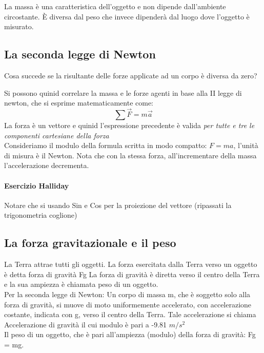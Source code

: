 \documentclass[12pt, a4paper, openany]{book}
\begin{document}
La massa è una caratteristica dell'oggetto e non dipende dall'ambiente circostante.
È diversa dal peso che invece dipenderà dal luogo dove l'oggetto è misurato.

\subsection*{La seconda legge di Newton}
Cosa succede se la risultante delle forze applicate ad un corpo è diversa da zero?

Si possono quinid correlare la massa e le forze agenti in base alla II legge di newton, che si esprime matematicamente come:
\[\sum \overrightarrow{F} = m\overrightarrow{a}\]
La forza è un vettore e quinid l'espressione precedente è valida \emph{per tutte e tre le componenti cartesiane della forza}
\\Consideriamo il modulo della formula scritta in modo compatto: $F=ma$, l'unità di misura è il Newton.
Nota che con la stessa forza, all'incrementare della massa l'accelerazione decrementa.

\paragraph*{Esercizio Halliday} Notare che si usando Sin e Cos per la proiezione del vettore (ripassati la trigonometria coglione)

\subsection*{La forza gravitazionale e il peso}
La Terra attrae tutti gli oggetti. La forza esercitata dalla Terra verso un oggetto è detta forza di
gravità Fg
La forza di gravità è diretta verso il centro della Terra e la sua ampiezza è chiamata peso di un
oggetto.
\\Per la seconda legge di Newton: Un corpo di massa m, che è soggetto solo alla forza di gravità, si muove di moto uniformemente
accelerato, con accelerazione costante, indicata con g, verso il centro della Terra.
Tale accelerazione si chiama Accelerazione di gravità il cui modulo è pari a -9.81 $m/s^2$
\\Il peso di un oggetto, che è pari all’ampiezza (modulo) della forza di gravità: Fg = mg.
\end{document}
